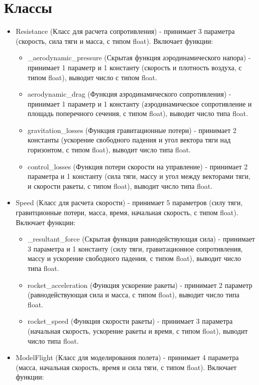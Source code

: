 \documentclass[a4paper, 12pt]{report}
\begin{document}
\section{Классы}
\begin{itemize}
    \item Resistance (Класс для расчета сопротивления) - принимает 3 параметра (скорость, сила тяги и масса, с типом float). Включает функции:
        \begin{itemize}
            \item \_aerodynamic\_pressure (Скрытая функция аэродинамического напора) - принимает 1 параметр и 1 константу (скорость и плотность воздуха, с типом float), выводит число с типом float.
            \item aerodynamic\_drag (Функция аэродинамического сопротивления) - принимает 1 параметр и 1 константу (аэродинамическое сопротивление и площадь поперечного сечения, с типом float), выводит число типа float.
            \item gravitation\_losses (Функция гравитационные потери) - принимает 2 константы (ускорение свободного падения и угол вектора тяги над горизонтом, с типом float), выводит число типа float.
            \item control\_losses (Функция потери скорости на управление) - принимает 2 параметра и 1 константу (сила тяги, массу и угол между векторами тяги, и скорости ракеты, с типом float), выводит число типа float.
        \end{itemize}
    \item Speed (Класс для расчета скорости) - принимает 5 параметров (силу тяги, гравитционные потери, масса, время, начальная скорость, с типом float). Включает функции:
        \begin{itemize}
            \item \_resultant\_force (Скрытая функция равнодействующая сила) - принимает 3 параметра и 1 константу (силу тяги, гравитационное сопротивления, массу и ускорение свободного падения, с типом float), выводит число типа float.
            \item rocket\_acceleration (Функция ускорение ракеты) - принимает 2 параметр (равнодействующая сила и масса, с типом float), выводит число типа float.
            \item rocket\_speed (Функция скорости ракеты) - принимает 3 параметра (начальная скорость, ускорение ракеты и время, с типом float), выводит число типа float.
        \end{itemize}
    \item ModelFlight (Класс для моделирования полета) - принимает 4 параметра (масса, начальная скорость, время и сила тяги, с типом float). Включает функции:

\end{itemize}
\end{document}
